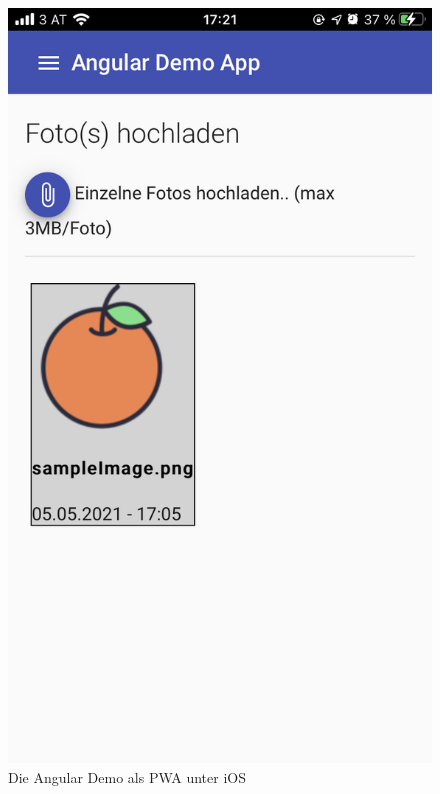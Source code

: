 \documentclass[a4paper,12pt,twoside]{scrreprt}
\begin{document}
\begin{figure}[ht]
    \centering
    \includegraphics[scale=0.2]{images/Luidold_Results-Angular-PWA.png}
    \caption[Die Angular Demo als \acs{PWA} unter iOS]{Die Angular Demo als \ac{PWA} unter iOS}
    \label{fig:results-angular-pwa}
\end{figure}
\end{document}
